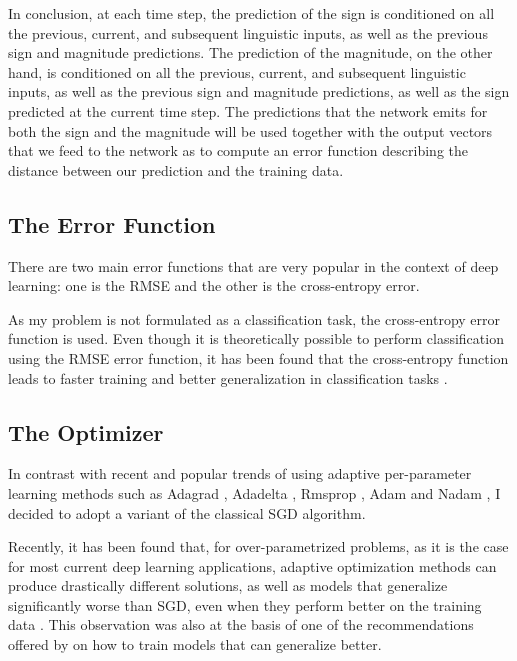 In conclusion, at each time step, the prediction of the sign is conditioned on all the previous, current, and subsequent linguistic inputs, as well as the previous sign and magnitude predictions.
The prediction of the magnitude, on the other hand, is conditioned on all the previous, current, and subsequent linguistic inputs, as well as the previous sign and magnitude predictions, as well as the sign predicted at the current time step.
The predictions that the network emits for both the sign and the magnitude will be used together with the output vectors that we feed to the network as to compute an error function describing the distance between our prediction and the training data.



\subsection{The Error Function}


There are two main error functions that are very popular in the context of deep learning: one is the \ac{RMSE} and the other is the cross-entropy error.

As my problem is not formulated as a classification task, the cross-entropy error function is used.
Even though it is theoretically possible to perform classification using the \ac{RMSE} error function, it has been found that the cross-entropy function leads to faster training and better generalization in classification tasks \citep{Golik2013Cross, Simard2003Best}.



\subsection{The Optimizer}

In contrast with recent and popular trends of using adaptive per-parameter learning methods such as Adagrad \citep{Duchi2011Adaptive}, Adadelta \citep{Zeiler2012ADADELTA}, Rmsprop \citep{Dauphin2015Equilibrated}, Adam \citep{Kingma2014Adam} and Nadam \citep{Dozat2016Incorporating}, I decided to adopt a variant of the classical \ac{SGD} algorithm.

Recently, it has been found that, for over-parametrized problems, as it is the case for most current deep learning applications, adaptive optimization methods can produce drastically different solutions, as well as models that generalize significantly worse than \ac{SGD}, even when they perform better on the training data \citep{Wilson2017Marginal}.
This observation was also at the basis of one of the recommendations offered by \citet{Hoffer2017Train} on how to train models that can generalize better.

